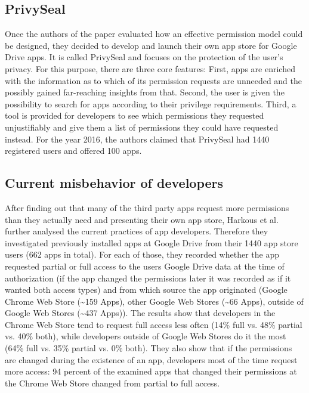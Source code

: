 \documentclass[11pt,twocolumn,a4paper,DIV=calc]{scrartcl}
\begin{document}
\subsection{PrivySeal} 
Once the authors of the paper evaluated how an effective permission model could be designed, they decided to develop and launch their own app store for Google Drive apps. It is called PrivySeal and focuses on the protection of the user's privacy. For this purpose, there are three core features: First, apps are enriched with the information as to which of its permission requests are unneeded and the possibly gained far-reaching insights from that. Second, the user is given the possibility to search for apps according to their privilege requirements. Third, a tool is provided for developers to see which permissions they requested unjustifiably and give them a list of permissions they could have requested instead. For the year 2016, the authors claimed that PrivySeal had 1440 registered users and offered 100 apps. 
\subsection{Current misbehavior of developers}
After finding out that many of the third party apps request more permissions than they actually need and presenting their own app store, Harkous et al. further analysed the current practices of app developers. Therefore they investigated previously installed apps at Google Drive from their 1440 app store users (662 apps in total). For each of those, they recorded whether the app requested partial or full access to the users Google Drive data at the time of authorization (if the app changed the permissions later it was recorded as if it wanted both access types) and from which source the app originated (Google Chrome Web Store (\textasciitilde 159 Apps), other Google Web Stores (\textasciitilde 66 Apps), outside of Google Web Stores (\textasciitilde 437 Apps)). 
The results show that developers in the Chrome Web Store tend to request full access less often (14\% full vs. 48\% partial vs. 40\% both), while developers outside of Google Web Stores do it the most (64\% full vs. 35\% partial vs. 0\% both). They also show that if the permissions are changed during the existence of an app, developers most of the time request more access: 94 percent of the examined apps that changed their permissions at the Chrome Web Store changed from partial to full access. 
\end{document}
